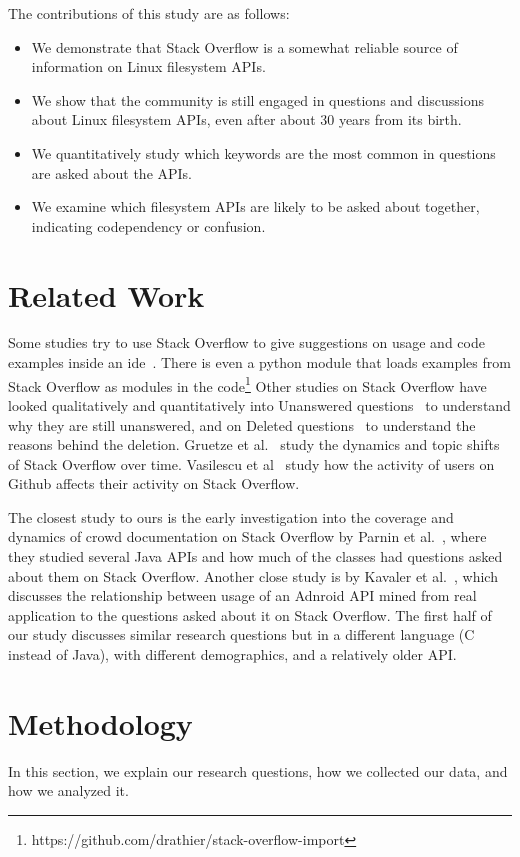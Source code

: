 The contributions of this study are as follows:
\begin{itemize}
  \item We demonstrate that Stack Overflow is a somewhat reliable source of information on Linux filesystem APIs.
  \item We show that the community is still engaged in questions and discussions about Linux filesystem APIs, even after about 30 years from its birth.
  \item We quantitatively study which keywords are the most common in questions are asked about the APIs.
  \item We examine which filesystem APIs are likely to be asked about together, indicating codependency or confusion.
\end{itemize}

\section{Related Work}\label{sec:relatedw}

Some studies try to use Stack Overflow to give suggestions on usage and code examples inside an ide~\cite{Ponzanelli2014}. There is even a python module that loads examples from Stack Overflow as modules in the code\footnote{https://github.com/drathier/stack-overflow-import}
Other studies on Stack Overflow have looked qualitatively and quantitatively into Unanswered questions~\cite{Asaduzzaman2013} to understand why they are still unanswered, and on Deleted questions~\cite{Correa2014} to understand the reasons behind the deletion. Gruetze et al.~\cite{Gruetze2016} study the dynamics and topic shifts of Stack Overflow over time. Vasilescu et al~\cite{Vasilescu2013} study how the activity of users on Github affects their activity on Stack Overflow.

The closest study to ours is the early investigation into the coverage and dynamics of crowd documentation on Stack Overflow by Parnin et al.~\cite{Parnin2012CrowdDE}, where they studied several Java APIs and how much of the classes had questions asked about them on Stack Overflow. Another close study is by Kavaler et al.~\cite{Kavaler2013}, which discusses the relationship between usage of an Adnroid API mined from real application to the questions asked about it on Stack Overflow. The first half of our study discusses similar research questions but in a different language (C instead of Java), with different demographics, and a relatively older API.

\section{Methodology}\label{sec:methodology}
In this section, we explain our research questions, how we collected our data, and how we analyzed it.
